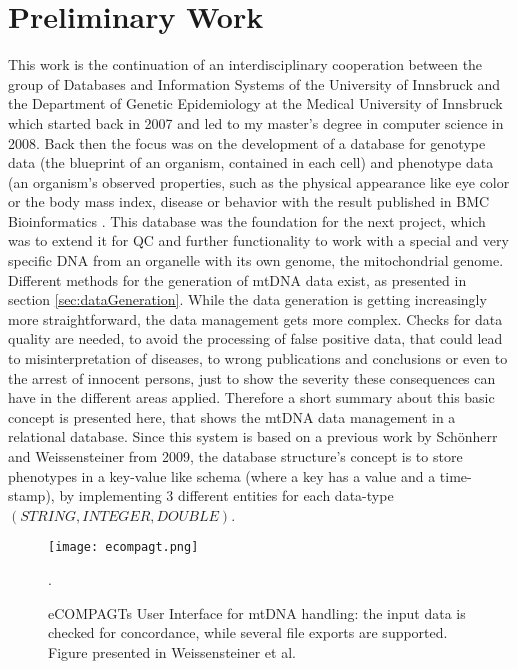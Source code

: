 \section{Preliminary Work}
\label{prelimWork}
This work is the continuation of an interdisciplinary cooperation between the group of Databases and Information Systems of the University of Innsbruck and the Department of Genetic Epidemiology at the Medical University of Innsbruck which started back in 2007 and led to my master's degree in computer science in 2008. Back then the focus was on the development of a database for genotype data (the blueprint of an organism, contained in each cell) and phenotype data (an organism's observed properties, such as the physical appearance like eye color or the body mass index, disease or behavior with the result published in BMC Bioinformatics \cite{Schoenherr2009}. This database was the foundation for the next project, which was to extend it for QC and further functionality to work with a special and very specific DNA from an organelle with its own genome, the mitochondrial genome. 
\\
Different methods for the generation of mtDNA data exist, as presented in section \ref{sec:dataGeneration}. While the data generation is getting increasingly more straightforward, the data management gets more complex. Checks for data quality are needed, to avoid the processing of false positive data, that could lead to misinterpretation of diseases, to wrong publications and conclusions or even to the arrest of innocent persons, just to show the severity these consequences can have in the different areas applied.
Therefore a short summary about this basic concept is presented here, that shows the mtDNA data management in a relational database. Since this system is based on a previous work by Sch\"onherr and Weissensteiner \cite{Schoenherr2009} from 2009, the database structure's concept is to store phenotypes in a key-value like schema (where a key has a value and a time-stamp), by implementing 3 different entities for each data-type $(STRING, INTEGER, DOUBLE)$.
\begin{figure}[ht]
\begin{center}
\texttt{[image: ecompagt.png]}
\caption[eCOMPAGTs User Interface]{eCOMPAGTs User Interface for mtDNA handling: the input data is checked for concordance, while several file exports are supported. Figure presented in Weissensteiner et al. \cite{Weissensteiner2010}}.
\label{fig:ecompagt}
\end{center}
\end{figure}
